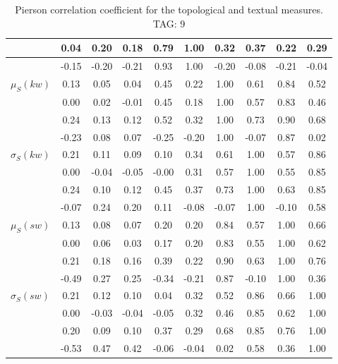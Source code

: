 \begin{table*}[h!]
\begin{center}
\begin{tabular}{| l | c | c | c | c | c | c | c | c | c |}
 & 0.04  & 0.20  & 0.18  & 0.79  & 1.00  & 0.32  & 0.37  & 0.22  & 0.29 \\\hline
 & -0.15  & -0.20  & -0.21  & 0.93  & 1.00  & -0.20  & -0.08  & -0.21  & -0.04 \\\hline
$\mu_S(kw)$ & 0.13  & 0.05  & 0.04  & 0.45  & 0.22  & 1.00  & 0.61  & 0.84  & 0.52 \\\hline
 & 0.00  & 0.02  & -0.01  & 0.45  & 0.18  & 1.00  & 0.57  & 0.83  & 0.46 \\\hline
 & 0.24  & 0.13  & 0.12  & 0.52  & 0.32  & 1.00  & 0.73  & 0.90  & 0.68 \\\hline
 & -0.23  & 0.08  & 0.07  & -0.25  & -0.20  & 1.00  & -0.07  & 0.87  & 0.02 \\\hline
$\sigma_S(kw)$ & 0.21  & 0.11  & 0.09  & 0.10  & 0.34  & 0.61  & 1.00  & 0.57  & 0.86 \\\hline
 & 0.00  & -0.04  & -0.05  & -0.00  & 0.31  & 0.57  & 1.00  & 0.55  & 0.85 \\\hline
 & 0.24  & 0.10  & 0.12  & 0.45  & 0.37  & 0.73  & 1.00  & 0.63  & 0.85 \\\hline
 & -0.07  & 0.24  & 0.20  & 0.11  & -0.08  & -0.07  & 1.00  & -0.10  & 0.58 \\\hline
$\mu_S(sw)$ & 0.13  & 0.08  & 0.07  & 0.20  & 0.20  & 0.84  & 0.57  & 1.00  & 0.66 \\\hline
 & 0.00  & 0.06  & 0.03  & 0.17  & 0.20  & 0.83  & 0.55  & 1.00  & 0.62 \\\hline
 & 0.21  & 0.18  & 0.16  & 0.39  & 0.22  & 0.90  & 0.63  & 1.00  & 0.76 \\\hline
 & -0.49  & 0.27  & 0.25  & -0.34  & -0.21  & 0.87  & -0.10  & 1.00  & 0.36 \\\hline
$\sigma_S(sw)$ & 0.21  & 0.12  & 0.10  & 0.04  & 0.32  & 0.52  & 0.86  & 0.66  & 1.00 \\\hline
 & 0.00  & -0.03  & -0.04  & -0.05  & 0.32  & 0.46  & 0.85  & 0.62  & 1.00 \\\hline
 & 0.20  & 0.09  & 0.10  & 0.37  & 0.29  & 0.68  & 0.85  & 0.76  & 1.00 \\\hline
 & -0.53  & 0.47  & 0.42  & -0.06  & -0.04  & 0.02  & 0.58  & 0.36  & 1.00 \\\hline
\end{tabular}
\caption{Pierson correlation coefficient for the topological and textual measures. TAG: 9}
\end{center}
\end{table*}